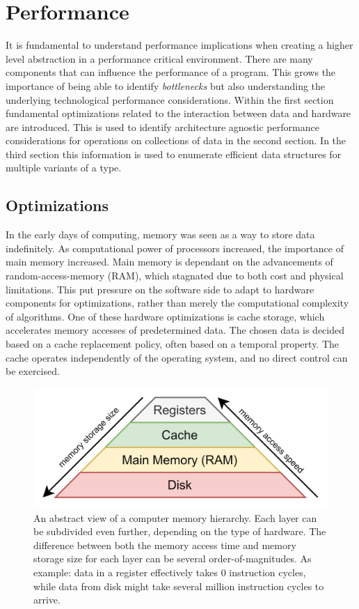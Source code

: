 \documentclass{article}
\begin{document}
\newpage

\section{Performance}

It is fundamental to understand performance implications when creating a higher level abstraction in a performance critical environment.
There are many components that can influence the performance of a program.
This grows the importance of being able to identify {\it bottlenecks} but also understanding the underlying technological performance considerations.
Within the first section fundamental optimizations related to the interaction between data and hardware are introduced.
This is used to identify architecture agnostic performance considerations for operations on collections of data in the second section.
In the third section this information is used to enumerate efficient data structures for multiple variants of a type.

\subsection{Optimizations}

In the early days of computing, memory was seen as a way to store data indefinitely.
As computational power of processors increased, the importance of main memory increased.
Main memory is dependant on the advancements of random-access-memory (RAM), which stagnated due to both cost and physical limitations\cite{memory}. 
This put pressure on the software side to adapt to hardware components for optimizations, rather than merely the computational complexity of algorithms.
One of these hardware optimizations is cache storage, which accelerates memory accesses of predetermined data.
The chosen data is decided based on a cache replacement policy, often based on a temporal property. 
The cache operates independently of the operating system\cite{memory}, and no direct control can be exercised.

\begin{figure}[ht]
    \centering
    \includegraphics[scale=0.10]{Performance1.png}
    \caption
    {
        An abstract view of a computer memory hierarchy. 
        Each layer can be subdivided even further, depending on the type of hardware. 
        The difference between both the memory access time and memory storage size for each layer can be several order-of-magnitudes.
        As example: data in a register effectively takes 0 instruction cycles, while data from disk might take several million instruction cycles to arrive.  
    }
\end{figure}
\end{document}
